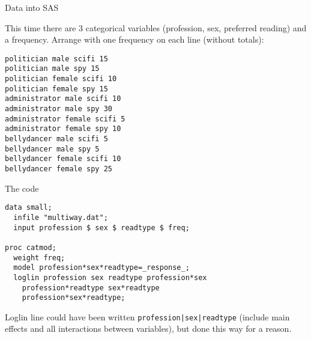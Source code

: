 \documentclass[pdf]{prosper}
\begin{document}
\begin{slide}{Data into SAS}

  This time there are 3 categorical variables (profession, sex,
  preferred reading) and a frequency. Arrange with one frequency on
  each line (without totals):

\begin{verbatim}
politician male scifi 15
politician male spy 15
politician female scifi 10
politician female spy 15
administrator male scifi 10
administrator male spy 30
administrator female scifi 5
administrator female spy 10
bellydancer male scifi 5
bellydancer male spy 5
bellydancer female scifi 10
bellydancer female spy 25
\end{verbatim}
  
\end{slide}

\begin{slide}{The code}

\begin{verbatim}
data small;
  infile "multiway.dat";
  input profession $ sex $ readtype $ freq;

proc catmod;
  weight freq;
  model profession*sex*readtype=_response_;
  loglin profession sex readtype profession*sex 
    profession*readtype sex*readtype 
    profession*sex*readtype;
\end{verbatim}

\vspace{3ex}

  Loglin line could have been written \verb-profession|sex|readtype-
  (include main effects and all interactions between variables), but
  done this way for a reason.
  
\end{slide}
\end{document}

